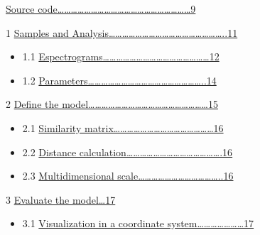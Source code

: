 \documentclass[
]{article}
\providecommand{\tightlist}{%
  \setlength{\itemsep}{0pt}\setlength{\parskip}{0pt}}
\begin{document}
\protect\hyperlink{code}{Source
code\ldots\ldots\ldots\ldots\ldots\ldots\ldots\ldots\ldots\ldots\ldots\ldots\ldots\ldots\ldots\ldots\ldots\ldots\ldots\ldots9}

\vspace{12pt}

1 \protect\hyperlink{samples-and-analysis}{Samples and
Analysis\ldots\ldots\ldots\ldots\ldots\ldots\ldots\ldots\ldots\ldots\ldots\ldots\ldots\ldots\ldots\ldots\ldots..11}

\begin{itemize}
\item
  1.1
  \protect\hyperlink{espectrograms}{Espectrograms\ldots\ldots\ldots\ldots\ldots\ldots\ldots\ldots\ldots\ldots\ldots\ldots\ldots\ldots\ldots\ldots12}
\item
  1.2
  \protect\hyperlink{acoustic-parameters-of-the-samples}{Parameters\ldots\ldots\ldots\ldots\ldots\ldots\ldots\ldots\ldots\ldots\ldots\ldots\ldots\ldots\ldots\ldots\ldots..14}
\end{itemize}

2 \protect\hyperlink{define-the-model}{Define the
model\ldots\ldots\ldots\ldots\ldots\ldots\ldots\ldots\ldots\ldots\ldots\ldots\ldots\ldots\ldots\ldots\ldots\ldots15}

\begin{itemize}
\item
  2.1 \protect\hyperlink{create-the-similarity-matrix}{Similarity
  matrix\ldots\ldots\ldots\ldots\ldots\ldots\ldots\ldots\ldots\ldots\ldots\ldots\ldots\ldots\ldots16}
\item
  2.2 \protect\hyperlink{calculation-of-distances}{Distance
  calculation\ldots\ldots\ldots\ldots\ldots\ldots\ldots\ldots\ldots\ldots\ldots\ldots\ldots\ldots.16}
\item
  2.3 \protect\hyperlink{multidimensional-scale}{Multidimensional
  scale\ldots\ldots\ldots\ldots\ldots\ldots\ldots\ldots\ldots\ldots\ldots\ldots..16}
\end{itemize}

3 \protect\hyperlink{Evaluate-the-model}{Evaluate the model\ldots17}

\begin{itemize}
\tightlist
\item
  3.1 \protect\hyperlink{visualization}{Visualization in a coordinate
  system\ldots\ldots\ldots\ldots\ldots\ldots\ldots17}
\end{itemize}

\vspace{12pt}
\end{document}
